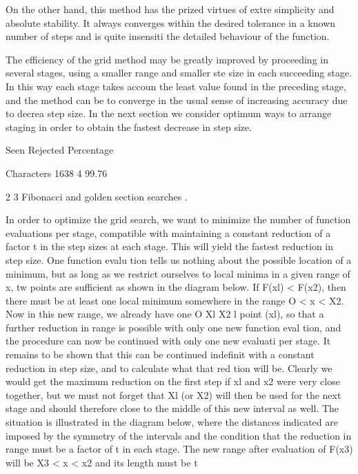      On the other hand, this method has the prized virtues of extre
simplicity and absolute stability.  It always converges within the
desired tolerance in a known number of steps and is quite insensiti
the detailed behaviour of the function.
 
     The efficiency of the grid method may be greatly improved by
proceeding in several stages, using a smaller range and smaller ste
size in each succeeding stage.  In this way each stage takes accoun
the least value found in the preceding stage, and the method can be
to converge in the usual sense of increasing accuracy due to decrea
step size.  In the next section we consider optimum ways to arrange
staging in order to obtain the fastest decrease in step size.
 
                 Seen Rejected  Percentage
 
Characters       1638        4   99.76
 
 
2 3  Fibonacci and golden section searches
 .
 
     In order to optimize the grid search, we want to minimize the
number of function evaluations per stage, compatible with maintaining
a constant reduction of a factor t in the step sizes at each stage.
This will yield the fastest reduction in step size.  One function evalu
tion tells us nothing about the possible location of a minimum, but as
long as we restrict ourselves to local minima in a given range of x, tw
points are sufficient as shown in the diagram below.  If F(xl) < F(x2),
                                      then there must be at least one
                                      local minimum somewhere in the
                                      range O < x < X2. Now in this
                                      new range, we already have one
O          Xl     X2          l       point (xl), so that a further
                                      reduction in range is possible
                                      with only one new function eval
tion, and the procedure can now be continued with only one new evaluati
per stage.  It remains to be shown that this can be continued indefinit
with a constant reduction in step size, and to calculate what that red
tion will be.  Clearly we would get the maximum reduction on the first
step if xl and x2 were very close together, but we must not forget that
Xl (or X2) will then be used for the next stage and should therefore
close to the middle of this new interval as well.  The situation is
illustrated in the diagram below, where the distances indicated are
imposed by the symmetry of the intervals and the condition that the
reduction in range must be a factor of t in each stage.  The new range
after evaluation of F(x3) will be X3 < x < x2 and its length must be t
 
